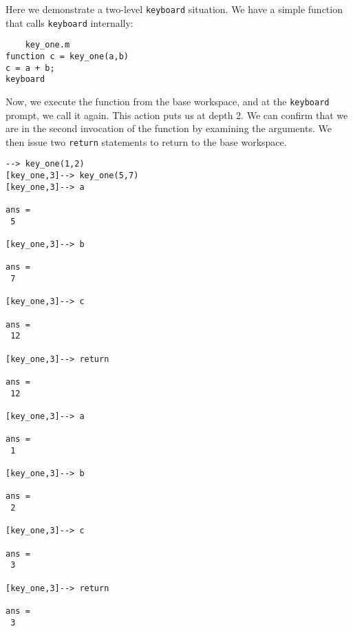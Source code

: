 Here we demonstrate a two-level \verb|keyboard| situation.  We have
a simple function that calls \verb|keyboard| internally:
\begin{verbatim}
    key_one.m
function c = key_one(a,b)
c = a + b;
keyboard
\end{verbatim}
Now, we execute the function from the base workspace, and
at the \verb|keyboard| prompt, we call it again.  This action
puts us at depth 2.  We can confirm that we are in the second
invocation of the function by examining the arguments.  We
then issue two \verb|return| statements to return to the base
workspace.
\begin{verbatim}
--> key_one(1,2)
[key_one,3]--> key_one(5,7)
[key_one,3]--> a

ans = 
 5 

[key_one,3]--> b

ans = 
 7 

[key_one,3]--> c

ans = 
 12 

[key_one,3]--> return

ans = 
 12 

[key_one,3]--> a

ans = 
 1 

[key_one,3]--> b

ans = 
 2 

[key_one,3]--> c

ans = 
 3 

[key_one,3]--> return

ans = 
 3 
\end{verbatim}
